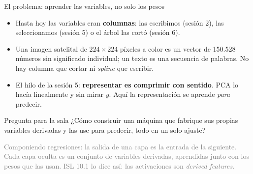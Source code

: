 \documentclass{beamer}
\newcommand{\1}{\mathbb{I}}
\begin{document}
\begin{frame}{El problema: aprender las variables, no solo los pesos}
\small
\begin{itemize}\itemsep3pt
  \item Hasta hoy las variables eran \textbf{columnas}: las escribimos (sesión 2), las seleccionamos (sesión 5) o el árbol las cortó (sesión 6). \pause
  \item Una imagen satelital de $224 \times 224$ píxeles a color es un vector de 150.528 números sin significado individual; un texto es una secuencia de palabras. No hay columna que cortar ni \emph{spline} que escribir. \pause
  \item El hilo de la sesión 5: \textbf{representar es comprimir con sentido}. PCA lo hacía linealmente y sin mirar $y$. Aquí la representación se aprende \emph{para} predecir.
\end{itemize}
\pause
\vspace{0.1cm}
\begin{block}{Pregunta para la sala}
¿Cómo construir una máquina que fabrique sus propias variables derivadas y las use para predecir, todo en un solo ajuste?
\end{block}
\pause
\textcolor{gray}{Componiendo regresiones: la salida de una capa es la entrada de la siguiente. Cada capa oculta es un conjunto de variables derivadas, aprendidas junto con los pesos que las usan. ISL 10.1 lo dice así: las activaciones son \emph{derived features}.}
\end{frame}
\end{document}
